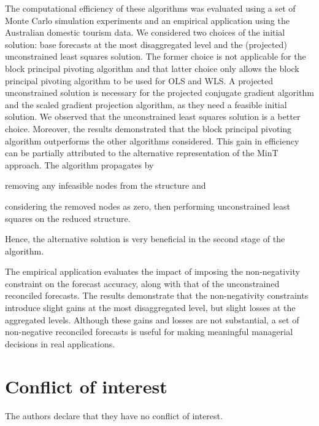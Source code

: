 \documentclass[twocolumn]{svjour3}
\begin{document}
The computational efficiency of these algorithms was evaluated using a set of Monte Carlo simulation experiments and an empirical application using the Australian domestic tourism data. We considered two choices of the initial solution: base forecasts at the most disaggregated level and the (projected) unconstrained least squares solution. The former choice is not applicable for the block principal pivoting algorithm and  that latter choice only allows the block principal pivoting algorithm to be used for OLS and WLS\@. A projected unconstrained solution is necessary for the projected conjugate gradient algorithm and the scaled gradient projection algorithm, as they need a feasible initial solution. We observed that the unconstrained least squares solution is a better choice. Moreover, the results demonstrated that the block principal pivoting algorithm outperforms the other algorithms considered. This gain in efficiency can be partially attributed to the alternative representation of the MinT approach. The algorithm propagates by \begin{inparaenum}[(i)] \item removing any infeasible nodes from the structure and \item considering the removed nodes as zero, then performing unconstrained least squares on the reduced structure. \end{inparaenum} Hence, the alternative solution is very beneficial in the second stage of the algorithm.

The empirical application evaluates the impact of imposing the non-negativity constraint on the forecast accuracy, along with that of the unconstrained reconciled forecasts. The results demonstrate that the non-negativity constraints introduce slight gains at the most disaggregated level, but slight losses at the aggregated levels. Although these gains and losses are not substantial, a set of non-negative reconciled forecasts is useful for making meaningful managerial decisions in real applications.


\section*{Conflict of interest}
The authors declare that they have no conflict of interest.

\printbibliography
\end{document}
